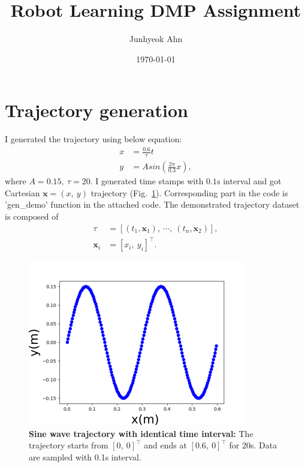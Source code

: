 \documentclass[11pt]{article}
\title{Robot Learning DMP Assignment}
\author{Junhyeok Ahn}
\date{\today}
\begin{document}
\maketitle

\section{Trajectory generation}
\label{sec:1}

I generated the trajectory using below equation:
\begin{equation}
    \label{eq:traj}
    \begin{split}
        x &= \frac{0.6}{\tau} t \\
        y &= A sin( \frac{2 \pi}{0.3} x),
    \end{split}
\end{equation}
where $A=0.15,~\tau=20$. I generated time stamps with
$0.1\si{\second}$ interval and got Cartesian $\mathbf{x}=(x,~y)$ trajectory
(Fig.~\ref{fig:time_even_traj}). Corresponding part in the code is 'gen\_demo'
function in the attached code. The demonstrated trajectory dataset is composed of
\begin{equation}
    \begin{split}
        \tau &= [(t_1,\mathbf{x}_{1}),~\cdots,~(t_n,\mathbf{x}_{2})],\\
        \mathbf{x}_{i} &= [x_i,~y_i]^\top.
    \end{split}
\end{equation}
\begin{figure}[htpb]
    \centering
    \includegraphics[width=0.5\linewidth]{figures/time_even_trajectory.png}
    \caption{ \textbf{Sine wave trajectory with identical time interval: }
    The trajectory starts from $[0,~0]^\top$ and ends at $[0.6,~0]^\top$ for
    $20$\si{\second}. Data are sampled with 0.1\si{\second} interval.}
    \label{fig:time_even_traj}
\end{figure}
\end{document}
